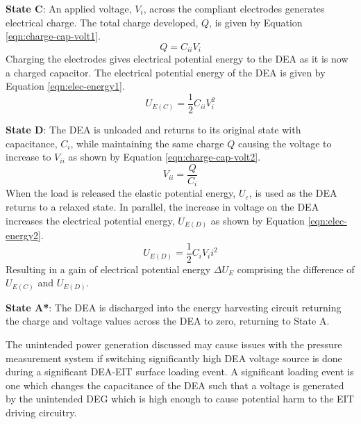 \textbf{State C}: An applied voltage, $V_i$, across the compliant electrodes generates electrical charge. The total charge developed, $Q$, is given by Equation \ref{eqn:charge-cap-volt1}.
\begin{equation}
	Q = C_{ii}V_{i}
	\label{eqn:charge-cap-volt1}
\end{equation}
Charging the electrodes gives electrical potential energy to the DEA as it is now a charged capacitor. The electrical potential energy of the DEA is given by Equation \ref{eqn:elec-energy1}.
\begin{equation}
	U_{E(C)} = \frac{1}{2}C_{ii}V_i^2
	\label{eqn:elec-energy1}
\end{equation}

\textbf{State D}: The DEA is unloaded and returns to its original state with capacitance, $C_i$, while maintaining the same charge $Q$ causing the voltage to increase to $V_{ii}$ as shown by Equation \ref{eqn:charge-cap-volt2}.
\begin{equation}
	V_{ii} = \frac{Q}{C_{i}}
	\label{eqn:charge-cap-volt2}
\end{equation}
When the load is released the elastic potential energy, $U_{\varepsilon}$, is used as the DEA returns to a relaxed state. In parallel, the increase in voltage on the DEA increases the electrical potential energy, $U_{E(D)}$ as shown by Equation \ref{eqn:elec-energy2}.
\begin{equation}
	U_{E(D)} = \frac{1}{2}C_{i}V_ii^2
	\label{eqn:elec-energy2}
\end{equation}
Resulting in a gain of electrical potential energy $\Delta U_E$ comprising the difference of $U_{E(C)}$ and $U_{E(D)}$.

\textbf{State A*}: The DEA is discharged into the energy harvesting circuit returning the charge and voltage values across the DEA to zero, returning to State A. 

The unintended power generation discussed may cause issues with the pressure measurement system if switching significantly high DEA voltage source is done during a significant DEA-EIT surface loading event. A significant loading event is one which changes the capacitance of the DEA such that a voltage is generated by the unintended DEG which is high enough to cause potential harm to the EIT driving circuitry. 



